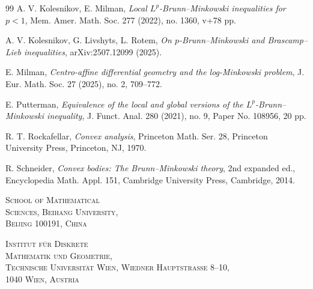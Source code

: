 \documentclass[12pt]{amsart}
\theoremstyle{plain}
\theoremstyle{definition}
\theoremstyle{remark}
\numberwithin{equation}{section}
\begin{document}
\begin{thebibliography}{99}
 A. V. Kolesnikov, E. Milman, 
\textit{Local $L^p$-Brunn--Minkowski inequalities for $p<1$}, Mem. Amer. Math. Soc. 277 (2022), no. 1360, v+78 pp.

 A. V. Kolesnikov, G. Livshyts, L. Rotem, \textit{On $p$-Brunn--Minkowski and Brascamp--Lieb inequalities}, arXiv:2507.12099 (2025).

 E. Milman, \textit{Centro-affine differential geometry and the log-Minkowski problem}, J. Eur. Math. Soc. 27 (2025), no. 2, 709--772.

 E. Putterman, \textit{Equivalence of the local and global versions of the $L^p$-Brunn--Minkowski inequality}, J. Funct. Anal. 280 (2021), no. 9, Paper No. 108956, 20 pp.

 R. T. Rockafellar, \textit{Convex analysis}, Princeton Math. Ser. 28, Princeton University Press, Princeton, NJ, 1970.

 R. Schneider, \textit{Convex bodies: The Brunn--Minkowski theory}, 2nd expanded ed., Encyclopedia Math. Appl. 151, Cambridge University Press, Cambridge, 2014.

\end{thebibliography}

\vspace{5mm}

\noindent
\begin{minipage}[t]{0.40\textwidth}
\textsc{School of Mathematical\\ Sciences, Beihang University,\\ Beijing 100191, China}\\
\end{minipage}
\hfill
\begin{minipage}[t]{0.40\textwidth}
\textsc{Institut f\"{u}r Diskrete\\ Mathematik und Geometrie,\\ Technische Universit\"{a}t Wien, Wiedner Hauptstra{\ss}e 8--10,\\ 1040 Wien, Austria}\\
\end{minipage}
\end{document}
